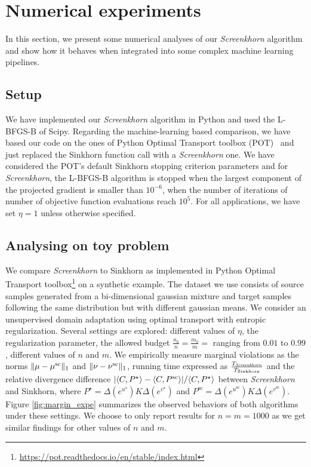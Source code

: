 
\section{Numerical experiments} %
\label{sec:numerical_experiments}

In this section, we present some numerical analyses of our
\emph{Screenkhorn} algorithm and show how it behaves when
integrated into some complex machine learning pipelines.

\subsection{Setup}

We have implemented our \emph{Screenkhorn} algorithm in Python and used the L-BFGS-B of
Scipy. Regarding the machine-learning based comparison, we have based our code
on the ones of Python Optimal Transport toolbox (POT)~\citep{flamary2017pot} and just replaced the Sinkhorn function call with a \emph{Screenkhorn} one. We have considered the POT's default Sinkhorn stopping criterion parameters and for \emph{Screenkhorn}, the L-BFGS-B algorithm is stopped when the 
largest component of the projected gradient is smaller than $10^{-6}$, when the number of iterations of number of objective function evaluations reach $10^{5}$. For all applications, we have set $\eta=1$ unless otherwise specified.

\subsection{Analysing on toy problem}

We compare \emph{Screenkhorn} to Sinkhorn as implemented in Python Optimal Transport toolbox\footnote{\url{https://pot.readthedocs.io/en/stable/index.html}} on  a synthetic example. The dataset we use consists of source samples generated from a bi-dimensional gaussian mixture and target samples following the same distribution but with different gaussian means. We consider an unsupervised domain adaptation using optimal transport with entropic regularization.  Several settings are explored: different values of $\eta$, the regularization parameter, the allowed budget $\frac{n_b}{n} = \frac{m_b}{m} = $ ranging from $0.01$ to $0.99$, different values of $n$ and $m$.
 We empirically measure  marginal violations as the norms $\|{\mu} -{\mu}^{\text{sc}}\|_1$ and $\|{\nu} -{\nu}^{\text{sc}}\|_1$, running time expressed as $\frac{T_{\text{\emph{Screenkhorn}}}}{T_{\text{Sinkhorn}}}$ and the relative divergence difference $| \langle C, P^\star \rangle - \langle C, P^{\text{sc}} \rangle|/\langle C, P^\star \rangle$ between \emph{Screenkhorn} and Sinkhorn, where $P^\star = \Delta(e^{u^\star}) K \Delta(e^{v^\star})$ and $P^{\text{sc}} = \Delta(e^{u^{\text{sc}}}) K \Delta(e^{v^{\text{sc}}}).$
Figure \ref{fig:margin_expe} summarizes the observed behaviors of both algorithms under these settings. We choose to only report results for $n=m=1000$ as we get similar findings for other values of $n$ and $m$. 

